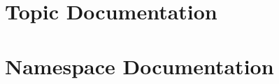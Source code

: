 \documentclass[twoside]{book}
\begin{document}
\chapter{Topic Documentation}

































\chapter{Namespace Documentation}



\end{document}
